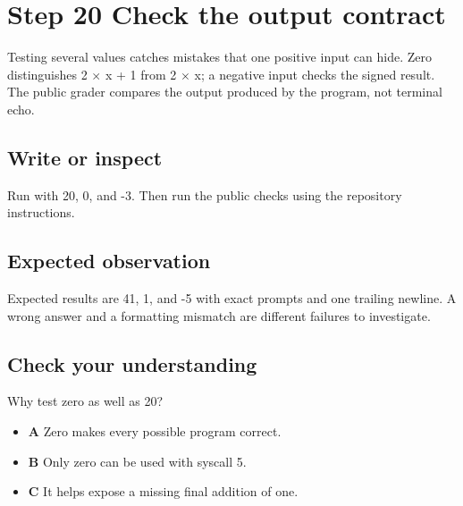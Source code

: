 \section{Step 20 Check the output
  contract}\label{001-console-calculation-s20-step-20-check-the-output-contract}

Testing several values catches mistakes that one positive input can
hide. Zero distinguishes 2 \ensuremath{\times} x + 1 from 2 \ensuremath{\times} x; a negative input checks
the signed result. The public grader compares the output produced by the
program, not terminal echo.

\subsection{Write or
  inspect}\label{001-console-calculation-s20-write-or-inspect}

Run with 20, 0, and -3. Then run the public checks using the repository
instructions.

\subsection{Expected
  observation}\label{001-console-calculation-s20-expected-observation}

Expected results are 41, 1, and -5 with exact prompts and one trailing
newline. A wrong answer and a formatting mismatch are different failures
to investigate.

\subsection{Check your
  understanding}\label{001-console-calculation-s20-check-your-understanding}

Why test zero as well as 20?

\begin{itemize}
  \tightlist
  \item
        \textbf{A} Zero makes every possible program correct.
  \item
        \textbf{B} Only zero can be used with syscall 5.
  \item
        \textbf{C} It helps expose a missing final addition of one.
\end{itemize}
